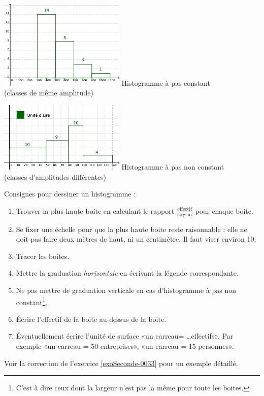 \begin{multicols}{2}
  \begin{center}
    \includegraphics[width=6cm]{Stats_Fig4_HistPC.png}
    Histogramme à pas constant \\
    (classes de même amplitude)     
  \end{center}

  \columnbreak

  \begin{center}
    \includegraphics[width=6cm]{Stats_Fig4_HistPNC.png}
    Histogramme à pas non constant \\
    (classes d'amplitudes différentes)
  \end{center}
  
\end{multicols}

Consignes pour dessiner un histogramme :
\begin{enumerate}
    \item
        Trouver la plus haute boite en calculant le rapport \( \frac{ \text{effectif} }{ \text{largeur} }\) pour chaque boite.
    \item
        Se fixer une échelle pour que la plus haute boite reste raisonnable : elle ne doit pas faire deux mètres de haut, ni un centimètre. Il faut viser environ \unit{10}{\centi\meter}.
    \item
        Tracer les boites.
    \item
        Mettre la graduation \emph{horizontale} en écrivant la légende correspondante.
    \item
        Ne pas mettre de graduation verticale en cas d'histogramme à pas non constant\footnote{C'est à dire ceux dont la largeur n'est pas la même pour toute les boites.}.
    \item
        Écrire l'effectif de la boite au-dessus de la boite.
    \item
        Éventuellement écrire l'unité de surface «un carreau= \ldots effectifs». Par exemple «un carreau = 50 entreprises», «un carreau = 15 personnes».
\end{enumerate}
Voir la correction de l'exercice \ref{exoSeconde-0033} pour un exemple détaillé.

